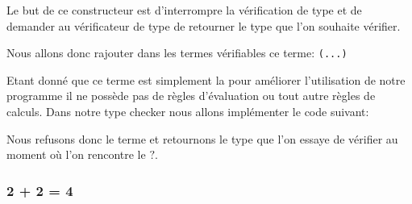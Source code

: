 \documentclass {article}
\newcommand{\codefrom}[3]
           {}
\theoremstyle{definition}
\theoremstyle{remark}
\begin{document}
Le but de ce constructeur est d'interrompre la vérification de type et de demander au vérificateur de type de
retourner le type que l'on souhaite vérifier. %

Nous allons donc rajouter dans les termes vérifiables ce terme:
\codefrom{dependent}{lambda}{inTm_head} \lstinline!(...)!
\codefrom{dependent}{lambda}{what}

Etant donné que ce terme est simplement la pour améliorer l'utilisation de notre programme
il ne possède pas de règles d'évaluation ou tout autre règles de calculs.
Dans notre type checker nous allons implémenter le code suivant:

\codefrom{dependent}{lambda}{check_what}

Nous refusons donc le terme et retournons le type que l'on essaye de vérifier au moment
où l'on rencontre le $?$.

\subsubsection{2 + 2 = 4}































\clearpage


  
\end{document}

